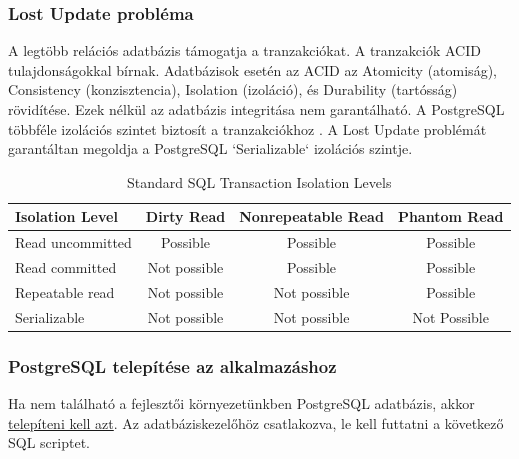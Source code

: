\subsubsection{Lost Update probléma}
A legtöbb relációs adatbázis támogatja a tranzakciókat. A tranzakciók ACID tulajdonságokkal bírnak.
Adatbázisok esetén az ACID az Atomicity (atomiság), Consistency (konzisztencia), Isolation (izoláció), és Durability (tartósság) rövidítése. Ezek nélkül az adatbázis integritása nem garantálható.
A PostgreSQL többféle izolációs szintet biztosít a tranzakciókhoz \cite{postgresql}. A Lost Update problémát garantáltan megoldja a PostgreSQL `Serializable` izolációs szintje.
\begin{table}[h]
    \centering
    \caption{ Standard SQL Transaction Isolation Levels}
    \begin{tabular}{l|c|c|c|}
Isolation Level & Dirty Read  & Nonrepeatable Read & Phantom Read\\
        \hline
Read uncommitted  & Possible & Possible & Possible \\
\hline
Read committed & Not possible & Possible & Possible \\
\hline
Repeatable read & Not possible & Not possible & Possible \\
\hline
Serializable & Not possible & Not possible & Not Possible \\
        \hline
    \end{tabular}
\end{table}

\subsubsection{PostgreSQL telepítése az alkalmazáshoz}\label{subsubsec:postgresql-telepítése-a-programhoz}

Ha nem található a fejlesztői környezetünkben PostgreSQL adatbázis, akkor \href{https://www.postgresql.org/download/}{telepíteni kell azt}.
Az adatbáziskezelőhöz csatlakozva, le kell futtatni a következő SQL scriptet.

